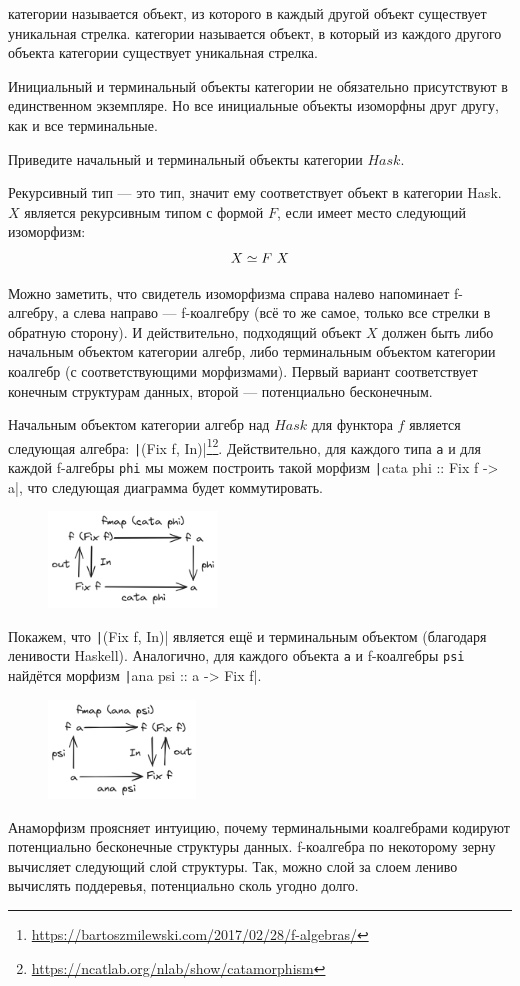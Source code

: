  категории называется объект, из которого в каждый другой объект существует уникальная стрелка.
 категории называется объект, в который из каждого другого объекта категории существует уникальная стрелка.

Инициальный и терминальный объекты категории не обязательно присутствуют в единственном экземпляре.
Но все инициальные объекты изоморфны друг другу, как и все терминальные.

\begin{task}
    Приведите начальный и терминальный объекты категории $Hask$.
\end{task}

Рекурсивный тип --- это тип, значит ему соответствует объект в категории Hask.
$X$ является рекурсивным типом с формой $F$, если имеет место следующий изоморфизм:
\[X \simeq F~ X\]

Можно заметить, что свидетель изоморфизма справа налево напоминает f-алгебру, а слева направо --- f-коалгебру (всё то же самое, только все стрелки в обратную сторону).
И действительно, подходящий объект $X$ должен быть либо начальным объектом категории алгебр, либо терминальным объектом категории коалгебр (с соответствующими морфизмами).
Первый вариант соответствует конечным структурам данных, второй --- потенциально бесконечным.

Начальным объектом категории алгебр над $Hask$ для функтора $f$ является следующая алгебра: \texttt|(Fix f, In)|\footnote{\url{https://bartoszmilewski.com/2017/02/28/f-algebras/}}\footnote{\url{https://ncatlab.org/nlab/show/catamorphism}}.
Действительно, для каждого типа \texttt{a} и для каждой f-алгебры \texttt{phi} мы можем построить такой морфизм \texttt|cata phi :: Fix f -> a|, что следующая диаграмма будет коммутировать.
\begin{figure}[h!]
    \centering
    \includegraphics[width=0.4\textwidth]{figs/cata}
\end{figure}

Покажем, что \texttt|(Fix f, In)| является ещё и терминальным объектом (благодаря ленивости Haskell). %
Аналогично, для каждого объекта \texttt{a} и f-коалгебры \texttt{psi} найдётся морфизм \texttt|ana psi :: a -> Fix f|.
\begin{figure}[h!]
    \centering
    \includegraphics[width=0.35\textwidth]{figs/ana}
\end{figure}

Анаморфизм проясняет интуицию, почему терминальными коалгебрами кодируют потенциально бесконечные структуры данных.
f-коалгебра по некоторому зерну вычисляет следующий слой структуры.
Так, можно слой за слоем лениво вычислять поддеревья, потенциально сколь угодно долго.
